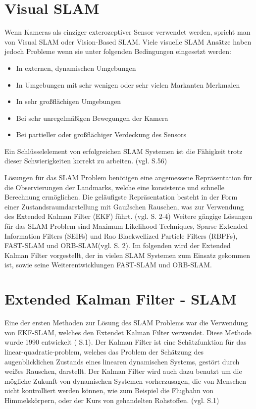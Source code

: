\section{Visual SLAM}

Wenn Kameras als einziger exterozeptiver Sensor verwendet werden, spricht man von \glqq Visual SLAM \grqq{} oder \glqq Vision-Based SLAM\grqq{}. Viele visuelle SLAM Ansätze haben jedoch Probleme wenn sie unter folgenden Bedingungen eingesetzt werden:

\begin{itemize}
\item In externen, dynamischen Umgebungen
\item In Umgebungen mit sehr wenigen oder sehr vielen Markanten Merkmalen
\item In sehr großflächigen Umgebungen
\item Bei sehr unregelmäßigen Bewegungen der Kamera
\item Bei partieller oder großflächiger Verdeckung des Sensors
\end{itemize}

Ein Schlüsselelement von erfolgreichen SLAM Systemen ist die Fähigkeit trotz dieser Schwierigkeiten korrekt zu arbeiten. (vgl. \cite{survey} S.56)

Lösungen für das SLAM Problem benötigen eine angemessene Repräsentation für die Observierungen der Landmarks, welche eine konsistente und schnelle Berechnung ermöglichen. Die geläufigste Repräsentation besteht in der Form einer Zustandsraumdarstellung mit Gaußschen Rauschen, was zur Verwendung des \glqq Extended Kalman Filter\grqq{} (EKF) führt. (vgl. \cite{slam} S. 2-4) Weitere gängige Lösungen für das SLAM Problem sind \glqq Maximum Likelihood Techniques\grqq{}, \glqq Sparse Extended Information Filters\grqq{} (SEIFs) und \glqq Rao Blackwellized Particle Filters\grqq{} (RBPFs), \glqq FAST-SLAM\grqq{} und \glqq ORB-SLAM\grqq (vgl. \cite{rao} S. 2). Im folgenden wird der Extended Kalman Filter vorgestellt, der in vielen SLAM Systemen zum Einsatz gekommen ist, sowie seine Weiterentwicklungen FAST-SLAM und ORB-SLAM.
  
 

\section{Extended Kalman Filter - SLAM}
Eine der ersten Methoden zur Lösung des SLAM Problems war die Verwendung von EKF-SLAM, welches den Extendet Kalman Filter verwendet. Diese Methode wurde 1990 entwickelt (\cite{orb_slam} S.1).
Der Kalman Filter ist eine Schätzfunktion für das \glqq linear-quadratic-problem\grqq , welches das Problem der Schätzung des augenblicklichen Zustands eines linearen dynamischen Systems, gestört durch weißes Rauschen, darstellt. Der Kalman Filter wird auch dazu benutzt um die mögliche Zukunft von dynamischen Systemen vorherzusagen, die von Menschen nicht kontrolliert werden können, wie zum Beispiel die Flugbahn von Himmelskörpern, oder der Kurs von gehandelten Rohstoffen. (vgl. \cite{ekf} S.1)


